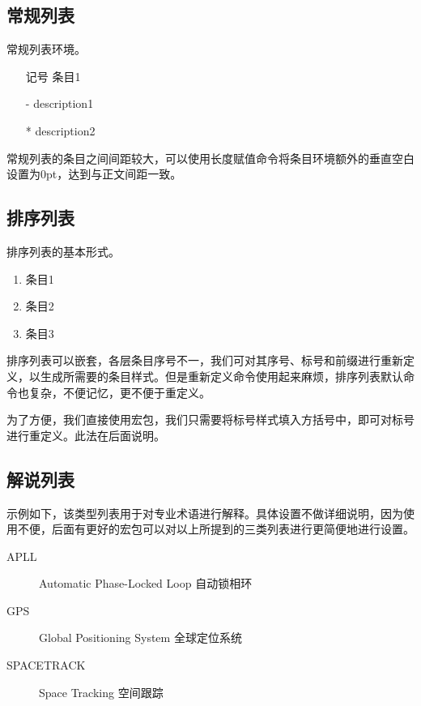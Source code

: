 \subsection{常规列表}
常规列表环境。

\begin{codeshow}
\begin{itemize}
	\item[记号] 条目1
	\item[-] description1
	\item[*] description2
\end{itemize}
\end{codeshow}

常规列表的条目之间间距较大，可以使用长度赋值命令将条目环境额外的垂直空白设置为0pt，达到与正文间距一致。

\begin{latex}{}
\itemsep=0pt
\parskip=0pt
\end{latex}

\subsection{排序列表}
排序列表的基本形式。

\begin{codeshow}
	\begin{enumerate}
		\item 条目1
		\item 条目2
		\item 条目3
	\end{enumerate}
\end{codeshow}

排序列表可以嵌套，各层条目序号不一，我们可对其序号、标号和前缀进行重新定义，以生成所需要的条目样式。但是重新定义命令使用起来麻烦，排序列表默认命令也复杂，不便记忆，更不便于重定义。

为了方便，我们直接使用宏包，我们只需要将标号样式填入方括号中，即可对标号进行重定义。此法在后面说明。

\subsection{解说列表}
示例如下，该类型列表用于对专业术语进行解释。具体设置不做详细说明，因为使用不便，后面有更好的宏包可以对以上所提到的三类列表进行更简便地进行设置。

\begin{codeshow}
	\begin{description}
		\item[APLL] 
		Automatic Phase-Locked Loop
		自动锁相环
		\item[GPS] Global 
		Positioning System 全球定位系统
		\item[SPACETRACK] 
		Space Tracking 空间跟踪
	\end{description}
\end{codeshow}

